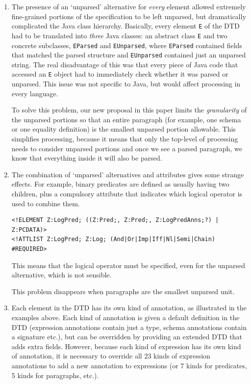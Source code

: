 \documentclass{llncs}  %
\begin{document}
\begin{enumerate}
\item The presence of an `unparsed' alternative for \emph{every} element
  allowed extremely fine-grained portions of the specification to be left
  unparsed, but dramatically complicated the Java class hierarchy.
  Basically, every element \verb!E! of the DTD had to be translated into
  \emph{three} Java classes: an abstract class \verb!E! and two concrete 
  subclasses, \verb!EParsed! and \verb!EUnparsed!, where \verb!EParsed!
  contained fields that matched the parsed structure and \verb!EUnparsed!
  contained just an unparsed string.  The real disadvantage of this was
  that every piece of Java code that accessed an \verb!E! object had to
  immediately check whether it was parsed or unparsed.  This issue was not
  specific to Java, but would affect processing in every language.
  
  To solve this problem, our new proposal in this paper limits the
  \emph{granularity} of the unparsed portions so that an entire paragraph
  (for example, one schema or one equality definition) is the smallest
  unparsed portion allowable.  This simplifies processing, because it means
  that only the top-level of processing needs to consider unparsed portions
  and once we see a parsed paragraph, we know that everything inside it
  will also be parsed.

\item The combination of `unparsed' alternatives and attributes
  gives some strange effects.  For example, binary predicates are
  defined as usually having two children, plus a compulsory attribute
  that indicates which logical operator is used to combine them.
\begin{small}
\begin{verbatim}
<!ELEMENT Z:LogPred; ((Z:Pred;, Z:Pred;, Z:LogPredAnns;?) | Z:PCDATA)>
<!ATTLIST Z:LogPred; Z:Log; (And|Or|Imp|Iff|Nl|Semi|Chain) #REQUIRED>
\end{verbatim}
\end{small}
  This means that the logical operator must be specified,
  even for the unparsed alternative, which is not sensible. 

  This problem disappears when paragraphs are the smallest unparsed unit.

\item Each element in the DTD has its own kind of annotation, as
  illustrated in the examples above.  Each kind of annotation is given
  a default definition in the DTD (expression annotations contain just a
  type, schema annotations contain a signature etc.), but can be
  overridden by providing an extended DTD that adds extra fields.
  However, because each kind of expression has its own kind of annotation,
  it is necessary to override all 23 kinds of expression annotations
  to add a new annotation to expressions (or 7 kinds for predicates, 
  5 kinds for paragraphs, etc.).
  

\end{enumerate}
\end{document}
